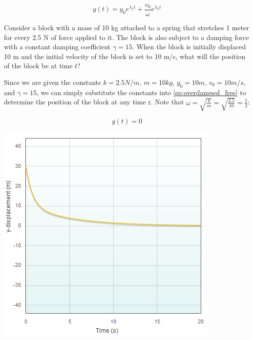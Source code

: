 \documentclass[11pt]{article} %
\newenvironment{Figure}
  {\par\medskip\noindent\minipage{\linewidth}}
  {\endminipage\par\medskip}
\begin{document}
\begin{multicols}{2}
\begin{equation}\label{eq:overdamped_free}
y(t) = {y_0}e^{{\lambda}_1t} + \frac{v_0}{\omega}e^{{\lambda}_2t}
\end{equation}

Consider a block with a mass of 10 kg attached to a spring that stretches 1 meter for every 2.5 N of force applied to it. The block is also subject to a damping force with a constant damping coefficient $\gamma = 15$. When the block is initially displaced 10 m and the initial velocity of the block is set to 10 m/s, what will the position of the block be at time $t$?

Since we are given the constants $k = 2.5 N/m$, $m = 10 kg$, $y_0 = 10 m$, $v_0 = 10 m/s$, and $\gamma = 15$, we can simply substitute the constants into \eqref{eq:overdamped_free} to determine the position of the block at any time $t$. Note that $\omega = \sqrt{\frac{k}{m}} = \sqrt{\frac{2.5}{10}} = \frac{1}{2}$:

\begin{equation}
y(t) = 0
\end{equation}

\begin{Figure}
 \centering
 \includegraphics[width=\linewidth]{overdamped_free.png}
\end{Figure}



\end{multicols}
\end{document}
